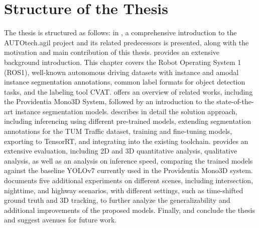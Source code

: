 \section{Structure of the Thesis}

The thesis is structured as follows: in , a comprehensive introduction to the AUTOtech.agil project and its related predecessors is presented, along with the motivation and main contribution of this thesis.  provides an extensive background introduction. This chapter covers the Robot Operating System 1 (ROS1), well-known autonomous driving datasets with instance and amodal instance segmentation annotations, common label formats for object detection tasks, and the labeling tool CVAT.  offers an overview of related works, including the Providentia Mono3D System, followed by an introduction to the state-of-the-art instance segmentation models.  describes in detail the solution approach, including inferencing using different pre-trained models, extending segmentation annotations for the TUM Traffic dataset, training and fine-tuning models, exporting to TensorRT, and integrating into the existing toolchain.  provides an extensive evaluation, including 2D and 3D quantitative analysis, qualitative analysis, as well as an analysis on inference speed, comparing the trained models against the baseline YOLOv7 currently used in the Providentia Mono3D system.  documents five additional experiments on different scenes, including intersection, nighttime, and highway scenarios, with different settings, such as time-shifted ground truth and 3D tracking, to further analyze the generalizability and additional improvements of the proposed models. Finally,  and  conclude the thesis and suggest avenues for future work.